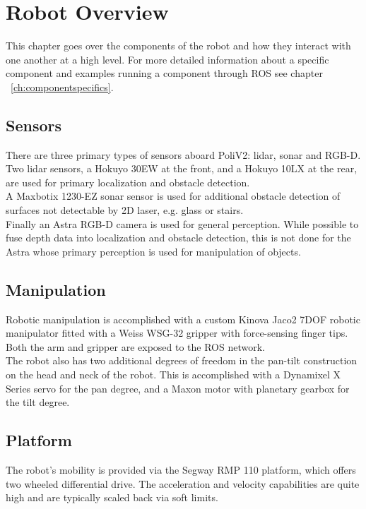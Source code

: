 \chapter{Robot Overview}\label{ch:overview}
This chapter goes over the components of the robot and how they interact with one another at a high level. 
For more detailed information about a specific component and examples running a component through ROS see chapter ~\ref{ch:componentspecifics}.

\section{Sensors}
There are three primary types of sensors aboard PoliV2: lidar, sonar and RGB-D.
Two lidar sensors, a Hokuyo 30EW at the front, and a Hokuyo 10LX at the rear, are used for primary localization and obstacle detection.\\

A Maxbotix 1230-EZ sonar sensor is used for additional obstacle detection of surfaces not detectable by 2D laser, e.g. glass or stairs.\\

Finally an Astra RGB-D camera is used for general perception. 
While possible to fuse depth data into localization and obstacle detection, this is not done for the Astra whose primary perception is used for manipulation of objects.

\section{Manipulation}
Robotic manipulation is accomplished with a custom Kinova Jaco2 7DOF robotic manipulator fitted with a Weiss WSG-32 gripper with force-sensing finger tips. Both the arm and gripper are exposed to the ROS network.\\

The robot also has two additional degrees of freedom in the pan-tilt construction on the head and neck of the robot.
This is accomplished with a Dynamixel X Series servo for the pan degree, and a Maxon motor with planetary gearbox for the tilt degree.

\section{Platform}
The robot's mobility is provided via the Segway RMP 110 platform, which offers two wheeled differential drive. 
The acceleration and velocity capabilities are quite high and are typically scaled back via soft limits.

